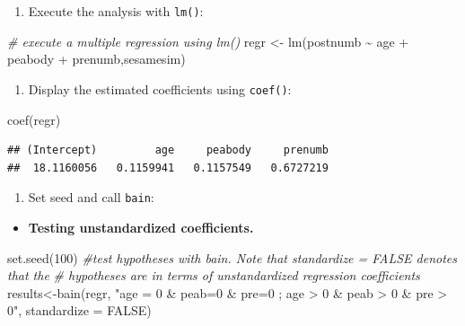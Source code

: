 \documentclass[
]{book}
\newenvironment{Shaded}{\begin{snugshade}}{\end{snugshade}}
\newcommand{\AttributeTok}[1]{\textcolor[rgb]{0.77,0.63,0.00}{#1}}
\newcommand{\CommentTok}[1]{\textcolor[rgb]{0.56,0.35,0.01}{\textit{#1}}}
\newcommand{\ConstantTok}[1]{\textcolor[rgb]{0.00,0.00,0.00}{#1}}
\newcommand{\DecValTok}[1]{\textcolor[rgb]{0.00,0.00,0.81}{#1}}
\newcommand{\FunctionTok}[1]{\textcolor[rgb]{0.00,0.00,0.00}{#1}}
\newcommand{\NormalTok}[1]{#1}
\newcommand{\OtherTok}[1]{\textcolor[rgb]{0.56,0.35,0.01}{#1}}
\newcommand{\SpecialCharTok}[1]{\textcolor[rgb]{0.00,0.00,0.00}{#1}}
\newcommand{\StringTok}[1]{\textcolor[rgb]{0.31,0.60,0.02}{#1}}
\providecommand{\tightlist}{%
  \setlength{\itemsep}{0pt}\setlength{\parskip}{0pt}}
\begin{document}
\begin{enumerate}
\def\labelenumi{\arabic{enumi})}
\tightlist
\item
  Execute the analysis with \texttt{lm()}:
\end{enumerate}

\begin{Shaded}
\begin{Highlighting}[]
\CommentTok{\# execute a multiple regression using lm()}
\NormalTok{regr }\OtherTok{\textless{}{-}} \FunctionTok{lm}\NormalTok{(postnumb }\SpecialCharTok{\textasciitilde{}}\NormalTok{ age }\SpecialCharTok{+}\NormalTok{ peabody }\SpecialCharTok{+}\NormalTok{ prenumb,sesamesim)}
\end{Highlighting}
\end{Shaded}

\begin{enumerate}
\def\labelenumi{\arabic{enumi})}
\setcounter{enumi}{1}
\tightlist
\item
  Display the estimated coefficients using \texttt{coef()}:
\end{enumerate}

\begin{Shaded}
\begin{Highlighting}[]
\FunctionTok{coef}\NormalTok{(regr)}
\end{Highlighting}
\end{Shaded}

\begin{verbatim}
## (Intercept)         age     peabody     prenumb 
##  18.1160056   0.1159941   0.1157549   0.6727219
\end{verbatim}

\begin{enumerate}
\def\labelenumi{\arabic{enumi})}
\setcounter{enumi}{2}
\tightlist
\item
  Set seed and call \texttt{bain}:
\end{enumerate}

\begin{itemize}
\tightlist
\item
  \textbf{Testing unstandardized coefficients.}
\end{itemize}

\begin{Shaded}
\begin{Highlighting}[]
\FunctionTok{set.seed}\NormalTok{(}\DecValTok{100}\NormalTok{)}
\CommentTok{\#test hypotheses with bain. Note that standardize = FALSE denotes that the}
\CommentTok{\# hypotheses are in terms of unstandardized regression coefficients}
\NormalTok{results}\OtherTok{\textless{}{-}}\FunctionTok{bain}\NormalTok{(regr, }\StringTok{"age = 0 \& peab=0 \& pre=0 ; age \textgreater{} 0 \& peab \textgreater{} 0 \& pre \textgreater{} 0"}\NormalTok{,}
              \AttributeTok{standardize =} \ConstantTok{FALSE}\NormalTok{)}
\end{Highlighting}
\end{Shaded}
\end{document}
